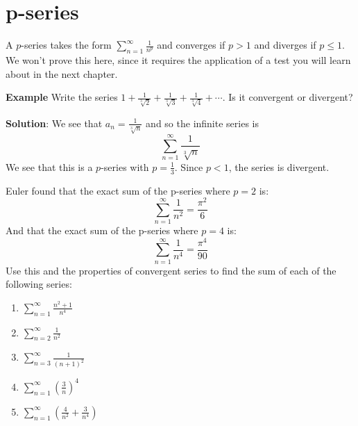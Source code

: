\section{p-series}
A $p$-series takes the form $\sum_{n=1}^\infty \frac{1}{n^p}$ and converges 
if $p > 1$ and diverges if $p \leq 1$. We won't prove this here, since it 
requires the application of a test you will learn about in the next chapter. 

\textbf{Example} Write the series $1 + \frac{1}{\sqrt[3]{2}} + \frac{1}{
\sqrt[3]{3}} + \frac{1}{\sqrt[3]{4}} + \cdots$. Is it convergent or divergent?

\textbf{Solution}: We see that $a_n = \frac{1}{\sqrt[3]{n}}$ and so the 
infinite series is $$\sum_{n=1}^\infty \frac{1}{\sqrt[3]{n}}$$ 
We see that this is a $p$-series with $p = \frac{1}{3}$. Since $p < 1$, the 
series is divergent. 

\begin{Exercise}[label = euler1]
Euler found that the exact sum of the p-series where $p=2$ is:
$$\sum_{n=1}^\infty \frac{1}{n^2} = \frac{\pi^2}{6}$$
And that the exact sum of the p-series where $p=4$ is:
$$\sum_{n=1}^\infty \frac{1}{n^4} = \frac{\pi^4}{90}$$
Use this and the properties of convergent series to find the sum of each of 
the following series:
\begin{enumerate}
\item $\sum_{n=1}^\infty \frac{n^2 + 1}{n^4}$
\item $\sum_{n=2}^\infty \frac{1}{n^2}$
\item $\sum_{n=3}^\infty \frac{1}{(n + 1)^2}$
\item $\sum_{n=1}^\infty \left( \frac{3}{n} \right)^4$
\item $\sum_{n=1}^\infty \left( \frac{4}{n^2} + \frac{3}{n^4} \right)$
\end{enumerate}
\vspace{50mm}
\end{Exercise}

